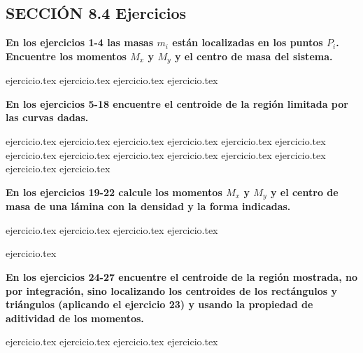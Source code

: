 
\subsection*{SECCIÓN 8.4 \quad Ejercicios}

\noindent\textbf{En los ejercicios 1-4 las masas $m_i$ están localizadas en los puntos $P_i$. Encuentre los momentos $M_x$ y $M_y$ y el centro de masa del sistema.}
\begin{enumerate}
    {ejercicio.tex}
{ejercicio.tex}
{ejercicio.tex}
{ejercicio.tex}
\end{enumerate}

\vspace{0.5cm}
\noindent\textbf{En los ejercicios 5-18 encuentre el centroide de la región limitada por las curvas dadas.}
\begin{enumerate}
    \setcounter{enumi}{4}
    {ejercicio.tex}
{ejercicio.tex}
{ejercicio.tex}
{ejercicio.tex}
{ejercicio.tex}
{ejercicio.tex}
{ejercicio.tex}
{ejercicio.tex}
{ejercicio.tex}
{ejercicio.tex}
{ejercicio.tex}
{ejercicio.tex}
{ejercicio.tex}
{ejercicio.tex}
\end{enumerate}

\vspace{0.5cm}
\noindent\textbf{En los ejercicios 19-22 calcule los momentos $M_x$ y $M_y$ y el centro de masa de una lámina con la densidad y la forma indicadas.}
\begin{enumerate}
    \setcounter{enumi}{18}
    {ejercicio.tex}
{ejercicio.tex}
{ejercicio.tex}
{ejercicio.tex}
\end{enumerate}

\vspace{0.5cm}
\begin{enumerate}
    \setcounter{enumi}{22}
    {ejercicio.tex}
\end{enumerate}

\vspace{0.5cm}
\noindent\textbf{En los ejercicios 24-27 encuentre el centroide de la región mostrada, no por integración, sino localizando los centroides de los rectángulos y triángulos (aplicando el ejercicio 23) y usando la propiedad de aditividad de los momentos.}
\begin{enumerate}
    \setcounter{enumi}{23}
    {ejercicio.tex}
{ejercicio.tex}
{ejercicio.tex}
{ejercicio.tex}
\end{enumerate}

